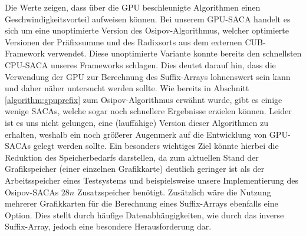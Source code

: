 Die Werte zeigen, dass über die GPU beschleunigte Algorithmen einen Geschwindigkeitsvorteil aufweisen können. Bei unserem GPU-SACA handelt es sich um eine unoptimierte Version des Osipov-Algorithmus, welcher optimierte Versionen der Präfixsumme und des Radixsorts aus dem externen CUB-Framework verwendet. Diese unoptimierte Variante konnte bereits den schnellsten CPU-SACA unseres Frameworks schlagen. Dies deutet darauf hin, dass die Verwendung der GPU zur Berechnung des Suffix-Arrays lohnenswert sein kann und daher näher untersucht werden sollte. Wie bereits in Abschnitt \ref{algorithm:gpuprefix} zum Osipov-Algorithmus erwähnt wurde, gibt es einige wenige SACAs, welche sogar noch schnellere Ergebnisse erzielen können. Leider ist es uns nicht gelungen, eine (lauffähige) Version dieser Algorithmen zu erhalten, weshalb ein noch größerer Augenmerk auf die Entwicklung von GPU-SACAs gelegt werden sollte. Ein besonders wichtiges Ziel könnte hierbei die Reduktion des Speicherbedarfs darstellen, da zum aktuellen Stand der Grafikspeicher (einer einzelnen Grafikkarte) deutlich geringer ist als der Arbeitsspeicher eines Testsystems und beispielsweise unsere Implementierung des Osipov-SACAs $28n$ Zusatzspeicher benötigt. Zusätzlich wäre die Nutzung mehrerer Grafikkarten für die Berechnung eines Suffix-Arrays ebenfalls eine Option. Dies stellt durch häufige Datenabhängigkeiten, wie durch das inverse Suffix-Array, jedoch eine besondere Herausforderung dar.
